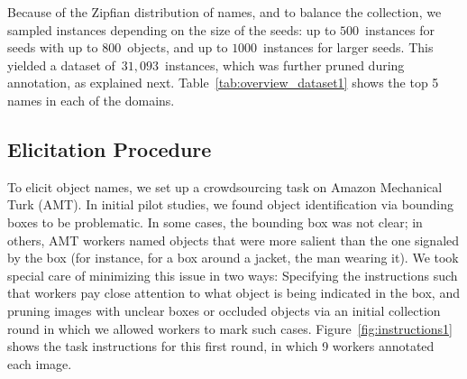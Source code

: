 Because of the Zipfian distribution of names, and to balance the collection, we sampled instances depending on the size of the seeds: up to $500$\ instances for seeds with up to $800$\ objects, and up to $1000$\ instances for larger seeds. This yielded a dataset of\ $31,093$~instances, which was further pruned during annotation, as explained next.
Table~\ref{tab:overview_dataset1} shows the top 5 \vg names in each of the domains. 

\subsection{Elicitation Procedure}
\label{ssec:elicitation}

To elicit object names, we set up a crowdsourcing task on Amazon Mechanical Turk (AMT).
In initial pilot studies, we found object identification via bounding boxes to be problematic.
In some cases, the bounding box was not clear; in others, AMT workers named objects that were more salient than the one signaled by the box (for instance, for a box around a jacket, the man wearing it).
We took special care of minimizing this issue in two ways: Specifying the instructions such that workers pay close attention to what object is being indicated in the box, and pruning images with unclear boxes or occluded objects via an initial collection round in which we allowed workers to mark such cases.
Figure~\ref{fig:instructions1} shows the task instructions for this first round, in which 9 workers annotated each image.

